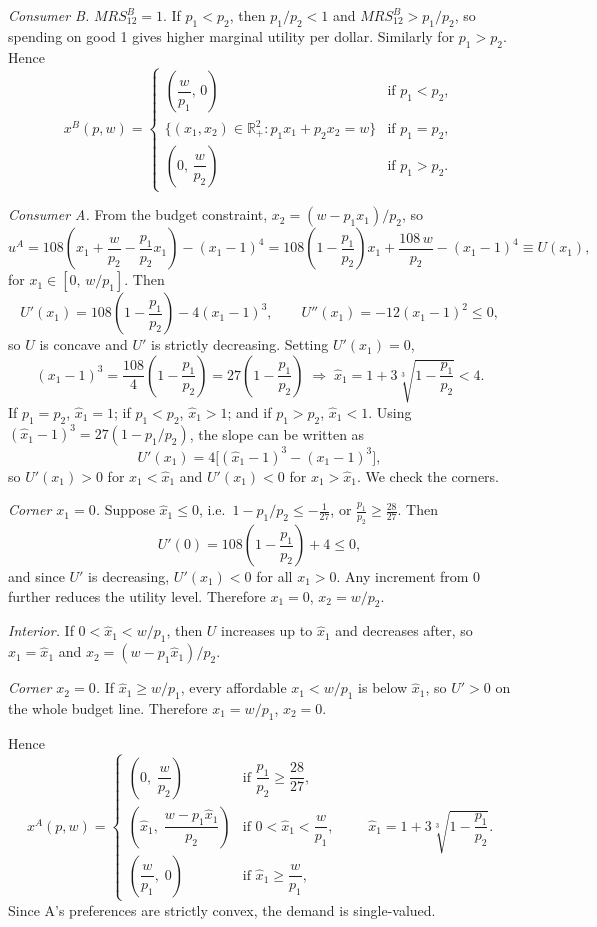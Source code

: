 \documentclass[12pt,letterpaper]{article}
\begin{document}
\textit{Consumer B.} $MRS^B_{12}=1$. If $p_1<p_2$, then $p_1/p_2<1$ and $MRS^B_{12}>p_1/p_2$, so spending on good 1 gives higher marginal utility per dollar. Similarly for $p_1>p_2$. Hence
\[
x^B(p,w)=\begin{cases}
\left(\dfrac{w}{p_1},\,0\right) & \text{if } p_1<p_2,\\[8pt]
\{(x_1,x_2)\in\mathbb{R}^2_+ : p_1x_1+p_2x_2=w\} & \text{if } p_1=p_2,\\[8pt]
\left(0,\,\dfrac{w}{p_2}\right) & \text{if } p_1>p_2 .
\end{cases}
\]

\textit{Consumer A.} From the budget constraint, $x_2=(w-p_1x_1)/p_2$, so
\[
u^A = 108\left(x_1 + \frac{w}{p_2} - \frac{p_1}{p_2}x_1\right) - (x_1-1)^4
= 108\left(1-\frac{p_1}{p_2}\right)x_1 + \frac{108\,w}{p_2} - (x_1-1)^4 \equiv U(x_1),
\]
for $x_1\in[0,\,w/p_1]$. Then
\[
U'(x_1) = 108\left(1-\frac{p_1}{p_2}\right) - 4(x_1-1)^3, \qquad U''(x_1) = -12(x_1-1)^2 \le 0,
\]
so $U$ is concave and $U'$ is strictly decreasing. Setting $U'(x_1)=0$,
\[
(x_1-1)^3 = \frac{108}{4}\left(1-\frac{p_1}{p_2}\right) = 27\left(1-\frac{p_1}{p_2}\right)
\;\Longrightarrow\;
\hat x_1 = 1 + 3\sqrt[3]{1-\frac{p_1}{p_2}} < 4 .
\]
If $p_1=p_2$, $\hat x_1=1$; if $p_1<p_2$, $\hat x_1>1$; and if $p_1>p_2$, $\hat x_1<1$. Using $(\hat x_1-1)^3 = 27(1-p_1/p_2)$, the slope can be written as
\[
U'(x_1) = 4\Big[(\hat x_1-1)^3 - (x_1-1)^3\Big],
\]
so $U'(x_1)>0$ for $x_1<\hat x_1$ and $U'(x_1)<0$ for $x_1>\hat x_1$. We check the corners.

\textit{Corner $x_1=0$.} Suppose $\hat x_1\le 0$, i.e.\ $1-p_1/p_2 \le -\frac{1}{27}$, or $\frac{p_1}{p_2}\ge\frac{28}{27}$. Then
\[
U'(0) = 108\left(1-\frac{p_1}{p_2}\right) + 4 \le 0,
\]
and since $U'$ is decreasing, $U'(x_1)<0$ for all $x_1>0$. Any increment from $0$ further reduces the utility level. Therefore $x_1=0$, $x_2=w/p_2$.

\textit{Interior.} If $0<\hat x_1<w/p_1$, then $U$ increases up to $\hat x_1$ and decreases after, so $x_1=\hat x_1$ and $x_2=(w-p_1\hat x_1)/p_2$.

\textit{Corner $x_2=0$.} If $\hat x_1\ge w/p_1$, every affordable $x_1<w/p_1$ is below $\hat x_1$, so $U'>0$ on the whole budget line. Therefore $x_1=w/p_1$, $x_2=0$.

Hence
\[
x^A(p,w)=\begin{cases}
\left(0,\;\dfrac{w}{p_2}\right) & \text{if } \dfrac{p_1}{p_2}\ge\dfrac{28}{27},\\[12pt]
\left(\hat x_1,\;\dfrac{w-p_1\hat x_1}{p_2}\right) & \text{if } 0<\hat x_1<\dfrac{w}{p_1},\\[12pt]
\left(\dfrac{w}{p_1},\;0\right) & \text{if } \hat x_1\ge\dfrac{w}{p_1},
\end{cases}
\qquad \hat x_1 = 1+3\sqrt[3]{1-\frac{p_1}{p_2}} .
\]
Since A's preferences are strictly convex, the demand is single-valued.
\end{document}
